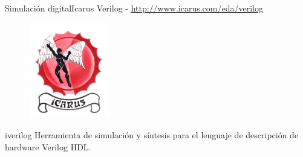 \documentclass{beamer}
\begin{document}


\begin{frame}{Simulación digital}{Icarus Verilog - \url{http://www.icarus.com/eda/verilog}}
  \begin{figure}[!h]
    \centering
    \includegraphics[scale=0.6]{img/icarus.png}
  \end{figure}
  \alert{iverilog} Herramienta de simulación y síntesis para el lenguaje de descripción de hardware Verilog HDL.
\end{frame}
\end{document}
